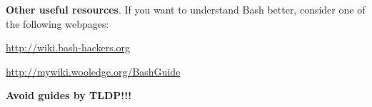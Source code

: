 \textbf{Other useful resources}.
If you want to understand Bash better, consider one of the following webpages:
{\small
\begin{compactenum}
\item \url{http://wiki.bash-hackers.org}
\item \url{http://mywiki.wooledge.org/BashGuide}
\end{compactenum}
}

{
\color{red}
\textbf{Avoid guides by TLDP!!!}
}

%